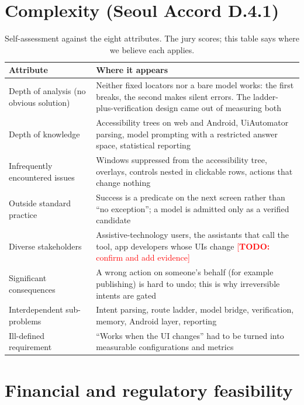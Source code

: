 \documentclass[11pt,a4paper]{article}
\newcommand{\todo}[1]{\textcolor{red}{[\textbf{TODO:} #1]}}
\begin{document}
\section{Complexity (Seoul Accord D.4.1)}
\begin{table}[h]\centering\small
\begin{tabularx}{\textwidth}{@{}l X@{}}
\toprule
Attribute & Where it appears\\\midrule
Depth of analysis (no obvious solution) & Neither fixed locators nor a bare model works: the first breaks, the second makes silent errors. The ladder-plus-verification design came out of measuring both\\
Depth of knowledge & Accessibility trees on web and Android, UiAutomator parsing, model prompting with a restricted answer space, statistical reporting\\
Infrequently encountered issues & Windows suppressed from the accessibility tree, overlays, controls nested in clickable rows, actions that change nothing\\
Outside standard practice & Success is a predicate on the next screen rather than ``no exception''; a model is admitted only as a verified candidate\\
Diverse stakeholders & Assistive-technology users, the assistants that call the tool, app developers whose UIs change \todo{confirm and add evidence}\\
Significant consequences & A wrong action on someone's behalf (for example publishing) is hard to undo; this is why irreversible intents are gated\\
Interdependent sub-problems & Intent parsing, route ladder, model bridge, verification, memory, Android layer, reporting\\
Ill-defined requirement & ``Works when the UI changes'' had to be turned into measurable configurations and metrics\\
\bottomrule
\end{tabularx}
\caption{Self-assessment against the eight attributes. The jury scores; this table says where we believe each applies.}
\end{table}

\section{Financial and regulatory feasibility}
\end{document}
